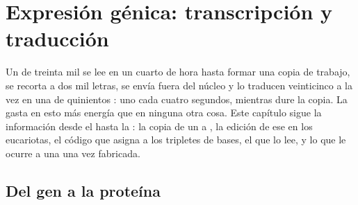 \chapter{Expresión génica: transcripción y traducción}\label{ch:b1:gene-expression}

Un  de treinta mil  se lee en un cuarto de hora hasta
formar una copia de trabajo, se recorta a dos mil letras, se envía fuera del
núcleo y lo traducen veinticinco  a la vez en una  de
quinientos : uno cada cuatro segundos, mientras dure la copia. La
 gasta en esto más energía que en ninguna otra cosa. Este capítulo
sigue la información desde el  hasta la : la copia de un  a
, la edición de ese  en los eucariotas, el código que asigna
 a los tripletes de bases, el  que lo lee, y lo que le
ocurre a una  una vez fabricada.

\section{Del gen a la proteína}

